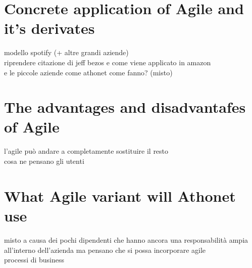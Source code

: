 


\section{Concrete application of Agile and it's derivates}
	modello spotify (+ altre grandi aziende)\\
	riprendere citazione di jeff bezos e come viene applicato in amazon\\
	e le piccole aziende come athonet come fanno? (misto)

\section{The advantages and disadvantafes of Agile}
	l'agile può andare a completamente sostituire il resto\\
	cosa ne pensano gli utenti

\section{What Agile variant will Athonet use}
	misto a causa dei pochi dipendenti che hanno ancora una responsabilità ampia all'interno dell'azienda ma pensano che si possa incorporare agile\\
	processi di business

